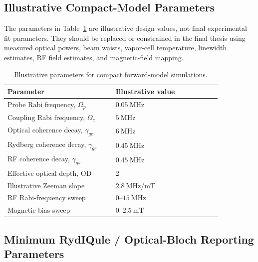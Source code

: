 \documentclass{ieeeaccess}
\begin{document}
\subsection{Illustrative Compact-Model Parameters}
\label{annex:baseline_parameters}

The parameters in Table~\ref{tab:annex_baseline_parameters} are illustrative design values, not final experimental fit parameters. They should be replaced or constrained in the final thesis using measured optical powers, beam waists, vapor-cell temperature, linewidth estimates, RF field estimates, and magnetic-field mapping.

\begin{table}[!t]
\caption{Illustrative parameters for compact forward-model simulations.}
\label{tab:annex_baseline_parameters}
\centering
\renewcommand{\arraystretch}{1.10}
\begin{tabular}{p{0.43\linewidth} p{0.42\linewidth}}
\hline
\textbf{Parameter} & \textbf{Illustrative value} \\
\hline
Probe Rabi frequency, \(\Omega_p\) & \(0.05~\mathrm{MHz}\) \\
Coupling Rabi frequency, \(\Omega_c\) & \(5~\mathrm{MHz}\) \\
Optical coherence decay, \(\gamma_{ge}\) & \(6~\mathrm{MHz}\) \\
Rydberg coherence decay, \(\gamma_{gr}\) & \(0.45~\mathrm{MHz}\) \\
RF coherence decay, \(\gamma_{gs}\) & \(0.45~\mathrm{MHz}\) \\
Effective optical depth, \(\mathrm{OD}\) & 2 \\
Illustrative Zeeman slope & \(2.8~\mathrm{MHz/mT}\) \\
RF Rabi-frequency sweep & \(0\text{--}15~\mathrm{MHz}\) \\
Magnetic-bias sweep & \(0\text{--}2.5~\mathrm{mT}\) \\
\hline
\end{tabular}
\end{table}

\subsection{Minimum RydIQule / Optical-Bloch Reporting Parameters}
\label{annex:rydiqule_parameters}
\end{document}
